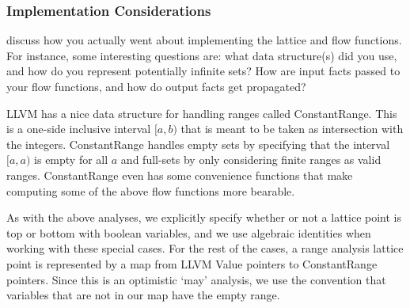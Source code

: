 \documentclass{article}
\theoremstyle{definition}
\begin{document}
\subsubsection{Implementation Considerations}
\begin{framed}
  discuss how you actually went about implementing the lattice and
  flow functions. For instance, some interesting questions are: what
  data structure(s) did you use, and how do you represent potentially
  infinite sets? How are input facts passed to your flow functions,
  and how do output facts get propagated?
\end{framed}

LLVM has a nice data structure for handling ranges called ConstantRange. This is a one-side inclusive interval $[a, b)$ that is meant to be taken as intersection with the integers. ConstantRange handles empty sets by specifying that the interval $[a,a)$ is empty for all $a$ and full-sets by only considering finite ranges as valid ranges. ConstantRange even has some convenience functions that make computing some of the above flow functions more bearable. 

As with the above analyses, we explicitly specify whether or not a lattice point is top or bottom with boolean variables, and we use algebraic identities when working with these special cases. For the rest of the cases, a range analysis lattice point is represented by a map from LLVM Value pointers to ConstantRange pointers. Since this is an optimistic `may' analysis, we use the convention that variables that are {not} in our map have the empty range.

 
\end{document}
